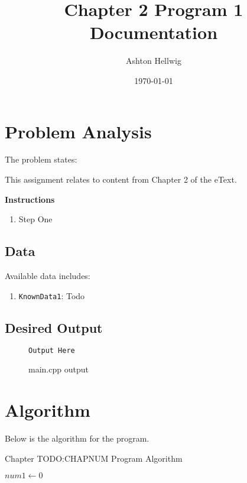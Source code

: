 \documentclass[a4paper,11pt]{article}
\title{Chapter 2 Program 1 Documentation}
\author{Ashton Hellwig}
\date\today
\begin{document}
  \maketitle
  \tableofcontents
  \listofalgorithms
  \lstlistoflistings
  \newpage


  \section{Problem Analysis}
    The problem states:
    \begin{mdframed}[backgroundcolor=green!20]
      This assignment relates to content from Chapter 2 of the eText.

      \textbf{Instructions}\vspace{-8pt}
      \begin{enumerate}
        \item Step One
      \end{enumerate}
    \end{mdframed}

    \subsection{Data}
      Available data includes:
      \begin{enumerate}
        \item \texttt{KnownData1}: Todo
      \end{enumerate}

    \subsection{Desired Output}
      \begin{figure}[h]
        \caption{main.cpp output}
        \begin{lstlisting}[language=bash]
Output Here
        \end{lstlisting}
        \label{fig:do}
      \end{figure}


  \newpage
  \section{Algorithm}
    Below is the algorithm for the program.
    \begin{algorithm}[h]
      \caption{Chapter TODO:CHAPNUM Program Algorithm}
      \vspace{12pt}
      \begin{algorithmic}[1]
          \State $num1\gets 0$
        \EndFunction
      \end{algorithmic}
      \label{alg:cTODO:CHAPNUMprogram}
    \end{algorithm}
\end{document}
